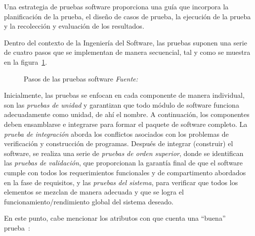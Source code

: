 Una estrategia de pruebas software proporciona una guía que incorpora la planificación de la prueba, el diseño de casos de prueba, la ejecución de la prueba y la recolección y evaluación de los resultados.

Dentro del contexto de la Ingeniería del Software, las pruebas suponen una serie de cuatro pasos que se implementan de manera secuencial, tal y como se muestra en la figura~\ref{fig:estrategiaPruebas}. 

\begin{figure}
	\centering
	\caption{Pasos de las pruebas software \textit{Fuente:~\cite{Pre10}}}
	\label{fig:estrategiaPruebas}
\end{figure}

Inicialmente, las pruebas se enfocan en cada componente de manera individual, son las \emph{pruebas de unidad} y garantizan que todo módulo de software funciona adecuadamente como unidad, de ahí el nombre. A continuación, los componentes deben ensamblarse e integrarse para formar el paquete de software completo. La \emph{prueba de integración} aborda los conflictos asociados con los problemas de verificación y construcción de programas. Después de integrar (construir) el software, se realiza una serie de \emph{pruebas de orden superior}, donde se identifican las \emph{pruebas de validación}, que proporcionan la garantía final de que el software cumple con todos los requerimientos funcionales y de compartimento abordados en la fase de requisitos, y las \emph{pruebas del sistema}, para verificar que todos los elementos se mezclan de manera adecuada y que se logra el funcionamiento/rendimiento global del sistema deseado.

En este punto, cabe mencionar los atributos con que cuenta una ``buena'' prueba~\cite{Kan99}:

